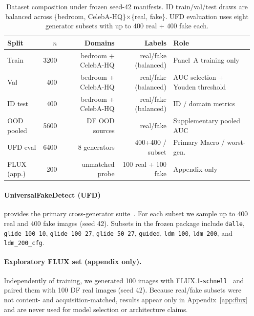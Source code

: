 \begin{table}[H]
\caption{Dataset composition under frozen seed-42 manifests.
ID train/val/test draws are balanced across \{bedroom, CelebA-HQ\}$\times$\{real, fake\}.
UFD evaluation uses eight generator subsets with up to 400 real + 400 fake each.\label{tab:data-comp}}
\scriptsize
\setlength{\tabcolsep}{3.5pt}
\begin{tabularx}{\textwidth}{@{}P{1.55cm}RRRP{3.6cm}@{}}
\toprule
\textbf{Split} & \textbf{$n$} & \textbf{Domains} & \textbf{Labels} & \textbf{Role} \\
\midrule
Train & 3200 & bedroom + CelebA-HQ & real/fake (balanced) & Panel~A training only \\
Val & 400 & bedroom + CelebA-HQ & real/fake (balanced) & AUC selection + Youden threshold \\
ID test & 400 & bedroom + CelebA-HQ & real/fake (balanced) & ID / domain metrics \\
OOD pooled & 5600 & DF OOD sources & real/fake & Supplementary pooled AUC \\
UFD eval & 6400 & 8 generators & 400+400 / subset & Primary Macro / worst-gen. \\
FLUX (app.) & 200 & unmatched probe & 100 real + 100 fake & Appendix only \\
\bottomrule
\end{tabularx}
\end{table}

\paragraph{UniversalFakeDetect (UFD)}
provides the primary cross-generator suite~\cite{ojha2023ufd}.
For each subset we sample up to 400 real and 400 fake images (seed 42).
Subsets in the frozen package include \texttt{dalle}, \texttt{glide\_100\_10}, \texttt{glide\_100\_27}, \texttt{glide\_50\_27}, \texttt{guided}, \texttt{ldm\_100}, \texttt{ldm\_200}, and \texttt{ldm\_200\_cfg}.

\paragraph{Exploratory FLUX set (appendix only).}
Independently of training, we generated 100 images with FLUX.1-\texttt{schnell}~\cite{flux2024} and paired them with 100 DF real images (seed 42).
Because real/fake subsets were not content- and acquisition-matched, results appear only in Appendix~\ref{app:flux} and are never used for model selection or architecture claims.

